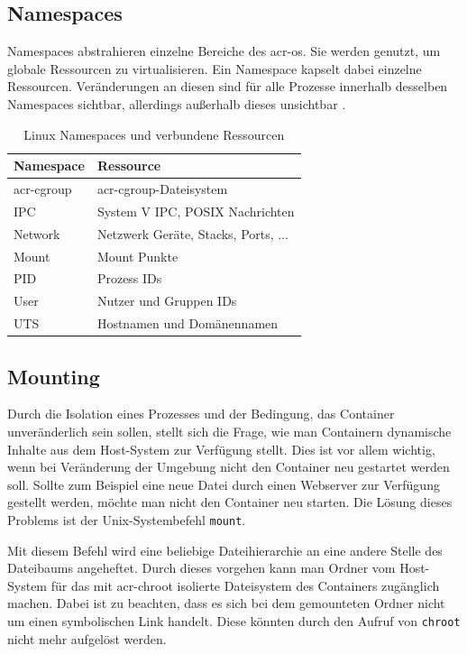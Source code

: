 \subsection{Namespaces}
\label{sec:namespaces}
Namespaces abstrahieren einzelne Bereiche des \gls{acr-os}. Sie werden genutzt, um globale Ressourcen zu virtualisieren. Ein Namespace kapselt dabei einzelne Ressourcen. Veränderungen an diesen sind für alle Prozesse innerhalb desselben Namespaces sichtbar, allerdings außerhalb dieses unsichtbar \citep{Namespaces7LinuxManualPage}.

\begin{table}[h]
	\begin{center}
		\begin{tabular}{ll}
			\toprule
			Namespace			& Ressource				 				\\
			\midrule
			\Gls{acr-cgroup}	& \Gls{acr-cgroup}-Dateisystem 			\\
			IPC					& System V IPC, POSIX Nachrichten 		\\
			Network				& Netzwerk Geräte, Stacks, Ports, ...	\\
			Mount				& Mount Punkte							\\
			PID					& Prozess IDs							\\
			User				& Nutzer und Gruppen IDs				\\
			UTS					& Hostnamen und Domänennamen			\\
			\bottomrule
		\end{tabular}
	\end{center}
	\caption{Linux Namespaces und verbundene Ressourcen \citep{Namespaces7LinuxManualPage}}
	\label{tab:namespaces}
\end{table}

\subsection{Mounting}
\label{sec:mount}
Durch die Isolation eines Prozesses und der Bedingung, das Container unveränderlich sein sollen, stellt sich die Frage, wie man Containern dynamische Inhalte aus dem Host-System zur Verfügung stellt. Dies ist vor allem wichtig, wenn bei Veränderung der Umgebung nicht den Container neu gestartet werden soll. Sollte zum Beispiel eine neue Datei durch einen Webserver zur Verfügung gestellt werden, möchte man nicht den Container neu starten. Die Lösung dieses Problems ist der Unix-Systembefehl \texttt{mount}. 

Mit diesem Befehl wird eine beliebige Dateihierarchie an eine andere Stelle des Dateibaums angeheftet. Durch dieses vorgehen kann man Ordner vom Host-System  für das mit \gls{acr-chroot} isolierte Dateisystem des Containers zugänglich machen. Dabei ist zu beachten, dass es sich bei dem gemounteten Ordner nicht um einen symbolischen Link handelt. Diese könnten durch den Aufruf von \texttt{chroot} nicht mehr aufgelöst werden.


